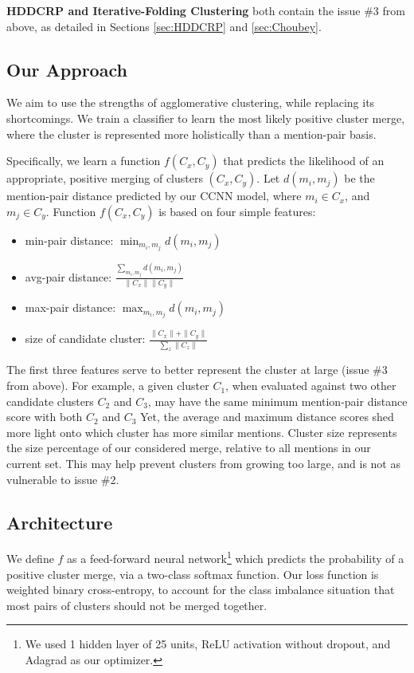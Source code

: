 \textbf{HDDCRP and Iterative-Folding Clustering} both contain the issue \#3 from above, as detailed in Sections \ref{sec:HDDCRP} and \ref{sec:Choubey}.

\subsection{Our Approach}
We aim to use the strengths of agglomerative clustering, while replacing its shortcomings.  We train a classifier to learn the most likely {positive cluster merge}, where the cluster is represented more holistically than a mention-pair basis.

Specifically, we learn a function $f(C_x,C_y)$ that predicts the likelihood of an appropriate, positive merging of clusters $(C_x,C_y)$. Let $d(m_i,m_j)$ be the mention-pair distance predicted by our CCNN model, where $m_i \in C_x$, and $m_j \in C_y$.  Function $f(C_x,C_y)$ is based on four simple features:
\begin{itemize}
  \item min-pair distance: $\min_{m_i,m_j} d(m_i,m_j)$
  \item avg-pair distance: $\frac{\sum_{m_i, m_j} d(m_i,m_j)}{\|C_x\|\|C_y\|}$
  \item max-pair distance: $\max_{m_i,m_j} d(m_i,m_j)$
  \item size of candidate cluster: $\frac{\|C_x\| + \|C_y\|}{\sum_{z}{\|C_z\|}}$
\end{itemize}

The first three features serve to better represent the cluster at large (issue \#3 from above).  For example, a given cluster $C_1$, when evaluated against two other candidate clusters $C_2$ and $C_3$, may have the same minimum mention-pair distance score with both $C_2$ and $C_3$  Yet, the average and maximum distance scores shed more light onto which cluster has more similar mentions. Cluster size represents the size percentage of our considered merge, relative to all mentions in our current set.  This may help prevent clusters from growing too large, and is not as vulnerable to issue \#2.

\subsection{Architecture}
We define $f$ as a feed-forward neural network\footnote{We used 1 hidden layer of 25 units, ReLU activation without dropout, and Adagrad as our optimizer.} which predicts the probability of a positive cluster merge, via a two-class softmax function.  Our loss function is weighted binary cross-entropy, to account for the class imbalance situation that most pairs of clusters should not be merged together.  

